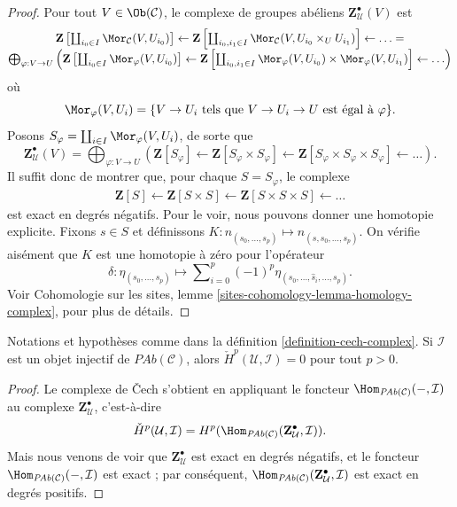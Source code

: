\begin{proof}
Pour tout $V\in \Ob(\mathcal{C})$, le complexe de groupes ab\'eliens
$\mathbf{Z}_\mathcal{U}^\bullet(V)$ est
$$
\begin{matrix}
\mathbf{Z}\left[
\coprod_{i_0\in I} \Mor_\mathcal{C}(V, U_{i_0})\right]
\leftarrow
\mathbf{Z}\left[
\coprod_{i_0, i_1 \in I}
\Mor_\mathcal{C}(V, U_{i_0} \times_U U_{i_1})\right]
\leftarrow \ldots = \\
\bigoplus_{\varphi : V \to U}
\left(
\mathbf{Z}\left[\coprod_{i_0 \in I} \Mor_\varphi(V, U_{i_0})\right]
\leftarrow
\mathbf{Z}\left[\coprod_{i_0, i_1\in I} \Mor_\varphi(V, U_{i_0}) \times
\Mor_\varphi(V, U_{i_1})\right]
\leftarrow
\ldots
\right)
\end{matrix}
$$
o\`u
$$
\Mor_{\varphi}(V, U_i)
=
\{ V \to U_i \text{ tels que } V \to U_i \to U \text{ est \'egal \`a } \varphi \}.
$$
Posons $S_\varphi = \coprod_{i\in I} \Mor_\varphi(V, U_i)$, de sorte que
$$
\mathbf{Z}_\mathcal{U}^\bullet(V)
=
\bigoplus_{\varphi : V \to U}
\left(
\mathbf{Z}[S_\varphi] \leftarrow
\mathbf{Z}[S_\varphi \times S_\varphi] \leftarrow
\mathbf{Z}[S_\varphi \times S_\varphi \times S_\varphi] \leftarrow
\ldots \right).
$$
Il suffit donc de montrer que, pour chaque $S = S_\varphi$, le complexe
\begin{align*}
\mathbf{Z}[S] \leftarrow
\mathbf{Z}[S \times S] \leftarrow
\mathbf{Z}[S \times S \times S] \leftarrow \ldots
\end{align*}
est exact en degr\'es n\'egatifs. Pour le voir, nous pouvons donner une homotopie explicite.
Fixons $s\in S$ et d\'efinissons $K: n_{(s_0, \ldots, s_p)} \mapsto n_{(s, s_0,
\ldots, s_p)}.$ On v\'erifie ais\'ement que $K$ est une homotopie \`a z\'ero pour l'op\'erateur
$$
\delta :
\eta_{(s_0, \ldots, s_p)}
\mapsto
\sum\nolimits_{i = 0}^p (-1)^p \eta_{(s_0, \ldots, \hat s_i, \ldots, s_p)}.
$$
Voir
Cohomologie sur les sites, lemme \ref{sites-cohomology-lemma-homology-complex},
pour plus de d\'etails.
\end{proof}

\begin{lemma}
\label{lemma-hom-injective}
Notations et hypoth\`eses comme dans la d\'efinition \ref{definition-cech-complex}.
Si $\mathcal{I}$ est un objet injectif de $\textit{PAb}(\mathcal{C})$,
alors $\check H^p(\mathcal{U}, \mathcal{I}) = 0$ pour tout $p > 0$.
\end{lemma}

\begin{proof}
Le complexe de {\v C}ech s'obtient en appliquant le foncteur
$\Hom_{\textit{PAb}(\mathcal{C})}(-, \mathcal{I}) $ au complexe $
\mathbf{Z}^\bullet_\mathcal{U} $, c'est-\`a-dire
$$
\check H^p(\mathcal{U}, \mathcal{I}) = H^p
(\Hom_{\textit{PAb}(\mathcal{C})} (\mathbf{Z}^\bullet_\mathcal{U},
\mathcal{I})).
$$
Mais nous venons de voir que $\mathbf{Z}^\bullet_\mathcal{U}$ est exact en
degr\'es n\'egatifs, et le foncteur $\Hom_{\textit{PAb}(\mathcal{C})}(-,
\mathcal{I})$ est exact ; par cons\'equent, $\Hom_{\textit{PAb}(\mathcal{C})}
(\mathbf{Z}^\bullet_\mathcal{U}, \mathcal{I})$ est exact en degr\'es positifs.
\end{proof}

